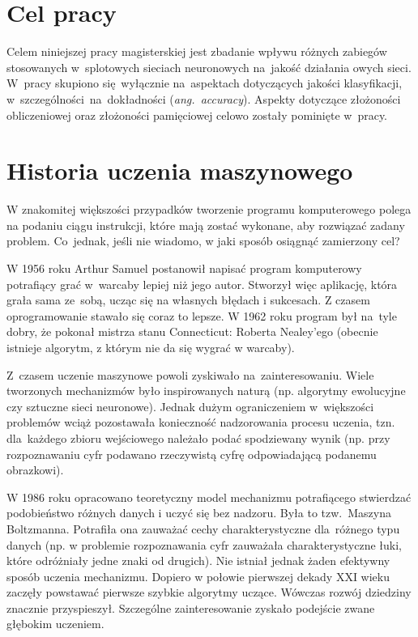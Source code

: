 \section{Cel pracy}
Celem niniejszej pracy magisterskiej jest zbadanie wpływu różnych zabiegów
stosowanych w~splotowych sieciach neuronowych na~jakość działania owych sieci.
W~pracy skupiono się~wyłącznie na~aspektach dotyczących jakości klasyfikacji,
w~szczególności~na~dokładności (\textit{ang.~accuracy}). Aspekty dotyczące złożoności
obliczeniowej oraz złożoności pamięciowej celowo zostały pominięte w~pracy.

\section{Historia uczenia maszynowego}
W znakomitej większości przypadków tworzenie programu komputerowego polega
na podaniu ciągu instrukcji, które mają zostać wykonane, aby rozwiązać zadany
problem. Co~jednak, jeśli nie wiadomo, w jaki sposób osiągnąć zamierzony cel?

W 1956 roku Arthur Samuel postanowił napisać program komputerowy
potrafiący grać w~warcaby lepiej niż jego autor. Stworzył więc aplikację,
która grała sama ze~sobą, ucząc się na własnych błędach i sukcesach.
Z czasem oprogramowanie stawało się coraz to lepsze. W 1962 roku program był
na~tyle dobry, że pokonał mistrza stanu Connecticut: Roberta Nealey'ego
(obecnie istnieje algorytm, z którym nie da się wygrać w warcaby).

Z~czasem uczenie maszynowe powoli zyskiwało na~zainteresowaniu.
Wiele tworzonych mechanizmów było inspirowanych naturą (np. algorytmy
ewolucyjne czy sztuczne sieci neuronowe). Jednak dużym ograniczeniem
w~większości problemów wciąż pozostawała konieczność nadzorowania procesu
uczenia, tzn. dla~każdego zbioru wejściowego należało podać spodziewany wynik
(np. przy rozpoznawaniu cyfr podawano rzeczywistą cyfrę odpowiadającą podanemu
obrazkowi).

W 1986 roku opracowano teoretyczny model mechanizmu potrafiącego stwierdzać
podobieństwo różnych danych i uczyć się bez nadzoru. Była to tzw.~Maszyna
Boltzmanna. Potrafiła ona zauważać cechy charakterystyczne dla~różnego typu
danych (np. w problemie rozpoznawania cyfr zauważała charakterystyczne łuki,
które odróżniały jedne znaki od drugich).
Nie istniał jednak żaden efektywny sposób uczenia mechanizmu.
Dopiero w połowie pierwszej dekady XXI wieku zaczęły powstawać pierwsze szybkie
algorytmy uczące. Wówczas rozwój dziedziny znacznie przyspieszył.
Szczególne zainteresowanie zyskało podejście zwane głębokim uczeniem.


